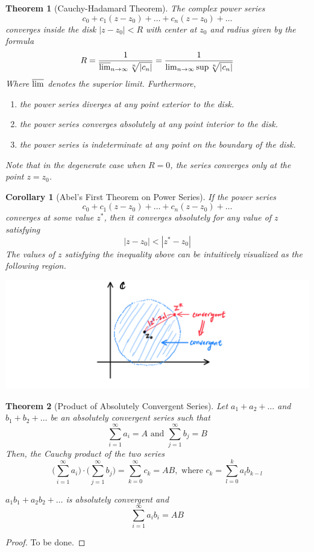 \documentclass{article}
\newtheorem{theorem}{Theorem}[section]
\newtheorem{corollary}{Corollary}[theorem]
\theoremstyle{remark}
\theoremstyle{definition}
\begin{document}
\begin{theorem}[Cauchy-Hadamard Theorem]
The complex power series 
\[c_0 + c_1 (z - z_0) + \ldots + c_n (z - z_0) + \ldots\]
converges inside the disk $|z - z_0| < R$ with center at $z_0$ and radius given by the formula
\[R = \frac{1}{\varlimsup_{n \rightarrow \infty} \sqrt[n]{|c_n|}} = \frac{1}{\lim_{n \rightarrow \infty} \sup{\sqrt[n]{|c_n|}}}\]
Where $\varlimsup$ denotes the superior limit. Furthermore, 
\begin{enumerate}
    \item the power series diverges at any point exterior to the disk. 
    \item the power series converges absolutely at any point interior to the disk. 
    \item the power series is indeterminate at any point on the boundary of the disk. 
\end{enumerate}
Note that in the degenerate case when $R = 0$, the series converges only at the point $z = z_0$. 
\end{theorem}

\begin{corollary}[Abel's First Theorem on Power Series]
If the power series 
\[c_0 + c_1 (z - z_0) + \ldots + c_n (z - z_0) + \ldots\]
converges at some value $z^*$, then it converges absolutely for any value of $z$ satisfying
\[|z - z_0| < |z^* - z_0|\]
The values of $z$ satisfying the inequality above can be intuitively visualized as the following region. 
\begin{center}
    \includegraphics[scale=0.3]{img/Abels_First_Theorem.PNG}
\end{center}
\end{corollary}

\begin{theorem}[Product of Absolutely Convergent Series]
Let $a_1 + a_2 + \ldots$ and $b_1 + b_2 + \ldots$ be an absolutely convergent series such that
\[\sum_{i=1}^\infty a_i = A \text{ and } \sum_{j=1}^\infty b_j = B\]
Then, the Cauchy product of the two series 
\[\bigg( \sum_{i=1}^\infty a_i \bigg) \cdot \bigg( \sum_{j=1}^\infty b_j \bigg) = \sum_{k=0}^\infty c_k = A B, \text{ where } c_k = \sum_{l=0}^k a_l b_{k-l}\]

$a_1 b_1 + a_2 b_2 + \ldots$ is absolutely convergent and 
\[\sum_{i = 1}^\infty a_i b_i = A B\]
\end{theorem}
\begin{proof}
To be done. 
\end{proof}
\end{document}

